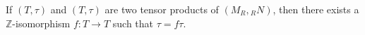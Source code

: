 If $(T, \tau)$ and $(T, \tau)$ are two tensor products of $(M_R, {}_R N)$, then there exists a $\mathbb{Z}$-isomorphism $f: T \to T$ such that $\tau = f \tau$.
